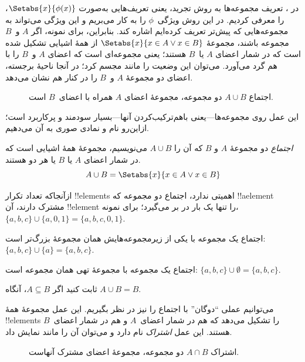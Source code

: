 \documentclass[../../../include/open-logic-section]{subfiles}
\begin{document}

\begin{explain}
در ، تعریف مجموعه‌ها به روش تجرید، یعنی
تعریف‌هایی به‌صورت $\Setabs{x}{\phi(x)}$، را معرفی کردیم. در این روش
ویژگی~$\phi$ را به کار می‌بریم و این ویژگی می‌تواند به مجموعه‌هایی که
پیش‌تر تعریف کرده‌ایم اشاره کند. بنابراین، برای نمونه، اگر $A$ و~$B$
مجموعه باشند، مجموعهٔ $\Setabs{x}{x \in A \lor x \in B}$ از همهٔ
اشیایی تشکیل شده است که در شمار اعضای $A$ یا~$B$ هستند؛ یعنی
مجموعه‌ای است که اعضای $A$ و~$B$ را با هم گرد می‌آورد.
می‌توان این وضعیت را مانند  مجسم کرد؛ در آنجا ناحیهٔ
برجسته، اعضای دو مجموعهٔ $A$ و~$B$ را در کنار هم نشان می‌دهد.

\begin{figure}
  \caption{اجتماع $A \cup B$ دو مجموعه، مجموعهٔ اعضای
   $A$ همراه با اعضای~$B$ است.}
\end{figure}

این عمل روی مجموعه‌ها---یعنی باهم‌ترکیب‌کردن آنها---بسیار سودمند و
پرکاربرد است؛ ازاین‌رو نام و نمادی صوری به آن می‌دهیم.
\end{explain}

\begin{defn}[اجتماع]
\emph{اجتماع} دو مجموعهٔ $A$ و $B$ که آن را $A \cup B$ می‌نویسیم،
مجموعهٔ همهٔ اشیایی است که در شمار اعضای $A$ یا $B$ یا هر دو هستند.
\[
A \cup B = \Setabs{x}{x \in A \lor x \in B}
\]
\end{defn}

\begin{ex}
ازآنجاکه تعداد تکرار !!{element}s اهمیتی ندارد، اجتماع دو مجموعه که
!!a{element} مشترک دارند، آن !!{element} را تنها یک بار در بر می‌گیرد؛
برای نمونه، $\{ a, b, c\} \cup \{ a, 0, 1\} = \{a, b, c, 0, 1\}$.

اجتماع یک مجموعه با یکی از زیرمجموعه‌هایش همان مجموعهٔ بزرگ‌تر است:
$\{a, b, c \} \cup \{a \} = \{a, b, c\}$.

اجتماع یک مجموعه با مجموعهٔ تهی همان مجموعه است: $\{a,
b, c \} \cup \emptyset = \{a, b, c \}$.
\end{ex}

\begin{prob}
ثابت کنید اگر $A \subseteq B$، آنگاه $A \cup B = B$.
\end{prob}

\begin{explain}
می‌توانیم عملی ``دوگان'' با اجتماع را نیز در نظر بگیریم. این عمل
مجموعهٔ همهٔ !!{element}s را تشکیل می‌دهد که هم در شمار اعضای~$A$
و هم در شمار اعضای~$B$ هستند. این عمل \emph{اشتراک} نام دارد و می‌توان
آن را مانند  نمایش داد.
\begin{figure}
  \caption{اشتراک $A \cap B$ دو مجموعه، مجموعهٔ
    اعضای مشترک آنهاست.}
\end{figure}
\end{explain}
\end{document}
